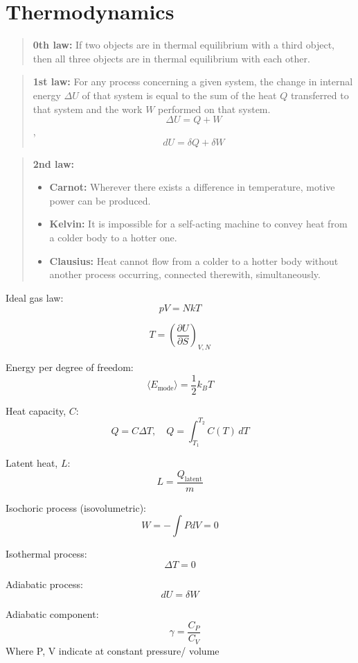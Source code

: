 \documentclass[12pt,a4paper]{article}
\begin{document}
	
\section*{Thermodynamics}

\begin{quote}
\textbf{0th law:} 
If two objects are in thermal equilibrium with a third object, then all three objects are in thermal equilibrium with each other.
\end{quote}
\begin{quote}
\textbf{1st law:} 
For any process concerning a given system, the change in internal energy \(\Delta U\) of that system is equal to the sum of the heat \( Q \) transferred to that system and the work \( W \) performed on that system.
\[ \Delta U = Q + W \] , \[ dU = \delta Q + \delta W\]
\end{quote}

\begin{quote}
\textbf{2nd law:} 
\begin{itemize}
	\item \textbf{Carnot:} Wherever there exists a difference in temperature, motive power can be produced.
	\item \textbf{Kelvin:} It is impossible for a self-acting machine to convey heat from a colder body to a hotter one.
	\item \textbf{Clausius:} Heat cannot flow from a colder to a hotter body without another process occurring, connected therewith, simultaneously.
\end{itemize}
\end{quote}

Ideal gas law: \[ pV = NkT\]

\[
T = \left( \frac{\partial U}{\partial S} \right)_{V, N}
\]

Energy per degree of freedom: \[ \langle E_\text{mode} \rangle = \frac{1}{2} k_B T \]


Heat capacity, $C$: \[ Q = C \Delta T, \quad Q = \int_{T_1}^{T_2} C(T) \, dT \]

Latent heat, $L$: \[ L  = \frac{Q_\text{latent}}{m} \]


Isochoric process (isovolumetric): \[ W = - \int P dV = 0\]

Isothermal process: \[ \Delta T = 0\]

Adiabatic process: \[ dU = \delta W\]

Adiabatic component: \[ \quad \gamma = \frac{C_P}{C_V} \]
Where P, V indicate at constant pressure/ volume
\end{document}
